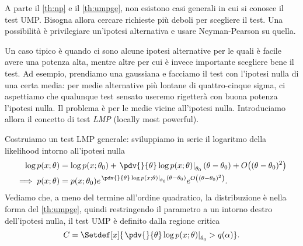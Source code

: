 
A parte il \autoref{th:np} e il \autoref{th:umpge},
non esistono casi generali in cui si conosce il test UMP.
Bisogna allora cercare richieste più deboli per scegliere il test.
Una possibilità è privilegiare un'ipotesi alternativa
e usare Neyman-Pearson su quella.


Un caso tipico è quando ci sono alcune ipotesi alternative
per le quali è facile avere una potenza alta,
mentre altre per cui è invece importante scegliere bene il test.
Ad esempio, prendiamo una gaussiana e facciamo il test con l'ipotesi nulla di una certa media:
per medie alternative più lontane di quattro-cinque sigma,
ci aspettiamo che qualunque test sensato useremo rigetterà con buona potenza l'ipotesi nulla.
Il problema è per le medie vicine all'ipotesi nulla.
Introduciamo allora il concetto di test \emph{LMP} (locally most powerful).

Costruiamo un test LMP generale:
sviluppiamo in serie il logaritmo della likelihood intorno all'ipotesi nulla
\begin{align*}
	\log p(x;\theta)
	&= \log p(x;\theta_0)
	+ \left.\pdv{}{\theta} \log p(x;\theta)\right|_{\theta_0} (\theta-\theta_0)
	+ O\big((\theta-\theta_0)^2\big) \\
	\implies p(x;\theta)
	&= p(x;\theta_0)
	e^{\left.\pdv{}{\theta} \log p(x;\theta)\right|_{\theta_0} (\theta-\theta_0)}
	e^{O\left((\theta-\theta_0)^2\right)}.
\end{align*}
Vediamo che, a meno del termine all'ordine quadratico,
la distribuzione è nella forma del \autoref{th:umpge},
quindi restringendo il parametro a un intorno destro dell'ipotesi nulla,
il test UMP è definito dalla regione critica
\begin{equation*}
	C = \Setdef[x]{\left.\pdv{}{\theta} \log p(x;\theta)\right|_{\theta_0} > q(\alpha)}.
\end{equation*}


